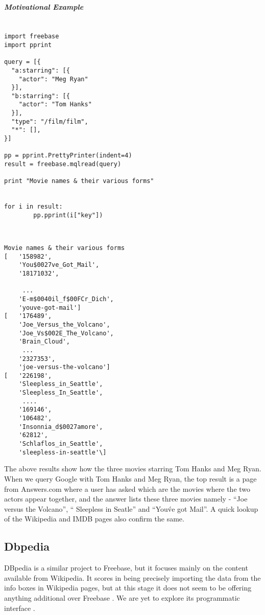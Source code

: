 \documentclass[11pt]{article}
\begin{document}
\subparagraph{Motivational Example}

\begin{lstlisting}[label=some-code,caption=Minimal code to Freebase]

import freebase
import pprint

query = [{
  "a:starring": [{
    "actor": "Meg Ryan"                                                       
  }],
  "b:starring": [{                                                            
    "actor": "Tom Hanks"
  }],
  "type": "/film/film",
  "*": [],
}]  
    
pp = pprint.PrettyPrinter(indent=4)
result = freebase.mqlread(query)
    
print "Movie names & their various forms"
    
    
for i in result:                                                              
        pp.pprint(i["key"])                                                   
                
\end{lstlisting}
\begin{lstlisting}[label=output,caption=Cleaned Output]

Movie names & their various forms
[   '158982',
    'You$0027ve_Got_Mail',
    '18171032',

     ...
    'E-m$0040il_f$00FCr_Dich',
    'youve-got-mail']
[   '176489',
    'Joe_Versus_the_Volcano',
    'Joe_Vs$002E_The_Volcano',
    'Brain_Cloud',
     ...
    '2327353',
    'joe-versus-the-volcano']
[   '226198',
    'Sleepless_in_Seattle',
    'Sleepless_In_Seattle',
     ....
    '169146',
    '106482',
    'Insonnia_d$0027amore',
    '62812',
    'Schlaflos_in_Seattle',
    'sleepless-in-seattle'\]

\end{lstlisting}

The above results show how the three movies starring Tom Hanks and Meg Ryan.
When we query Google with Tom Hanks and Meg Ryan, the top result is a page from
Answers.com where a user has asked which are the movies where the two actors
appear together, and the answer lists these three movies namely - ``Joe versus
the Volcano'', `` Sleepless in Seatle'' and ``You\'ve got Mail''. A quick lookup
of the Wikipedia and IMDB pages also confirm the same. 

\subsection{Dbpedia}
DBpedia is a similar project to Freebase, but it focuses mainly on the content
available from Wikipedia. It scores in being precisely importing the data from
the info boxes in Wikipedia pages, but at this stage it does not seem to be
offering anything additional over Freebase \cite{freebasedbpedia}. We are yet to
explore its programmatic interface \cite{dbpediaapi}.
\end{document}
